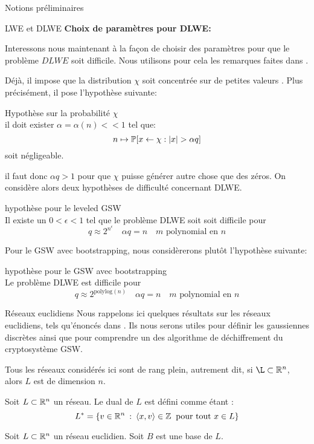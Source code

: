 \begin{section}{Notions préliminaires}
\begin{subsection}{LWE et DLWE}
	\textbf{Choix de paramètres pour DLWE:}

	Interessons nous maintenant à la façon de choisir des paramètres
	pour que le problème $DLWE$ soit difficile. Nous utilisons pour cela 
	les remarques faites dans \cite{halevi}.

	Déjà, il impose que la distribution $\chi$ soit \og concentrée sur de
	petites valeurs \fg. Plus précisément, il pose l'hypothèse suivante: 

	\begin{hyp}{Hypothèse sur la probabilité $\chi$}\\ \label{hyp:proba}
	il doit exister $\alpha = \alpha(n) << 1$ tel que:
	\[ n \mapsto \mathbb{P} [x \leftarrow \chi : |x| > \alpha q]\] 
	soit négligeable.
	\end{hyp}

	il faut donc $\alpha q > 1$ pour que $\chi$ puisse générer autre chose 
	que des zéros. 
	On considère alors deux hypothèses de difficulté 
	concernant DLWE. 

	\begin{hyp}{hypothèse pour le leveled GSW} \\
	\label{hyp_dlwe}
	Il existe un $0 < \epsilon < 1$ tel que le problème DLWE soit
	soit difficile pour 
	\[ q \approx 2^{n^\epsilon}\quad \alpha q = n\quad \text{$m$ polynomial en $n$}\]
	\end{hyp}

	Pour le GSW avec bootstrapping, nous considèrerons plutôt l'hypothèse
	suivante:
	\begin{hyp}{hypothèse pour le GSW avec bootstrapping} \\
	\label{hyp_dlwe_boot}
	Le problème DLWE est difficile pour 
	\[ q \approx 2^\text{polylog$(n)$}\quad \alpha q = n\quad \text{$m$ polynomial en $n$}\]
	\end{hyp}


	\end{subsection}
	\begin{subsection}{Réseaux euclidiens}
	Nous rappelons ici quelques résultats sur les réseaux euclidiens, tels qu'énoncés dans \cite{EC:MicPei12}. Ils nous serons utiles pour définir les gaussiennes discrètes ainsi que pour comprendre un des algorithme de déchiffrement du cryptosystème GSW.

	Tous les réseaux considérés ici sont de rang plein, autrement dit, si $\L \subset \RR^n$, alors $L$ est de dimension $n$.

	\begin{definition}
	Soit $L\subset \mathbb{R}^n$ un réseau. Le dual de $L$ est défini comme étant :
	\[ L^* = \{ v \in \mathbb{R}^n \::\: \langle x, v \rangle \in \mathbb{Z}
	   \:\text{ pour tout } x\in L\} \]
	\end{definition}
	\begin{prop} 
	Soit $L \subset \mathbb{R}^n$ un réseau euclidien. Soit $B$ est une base de $L$.
	

\end{prop}
\end{subsection}
\end{section}
